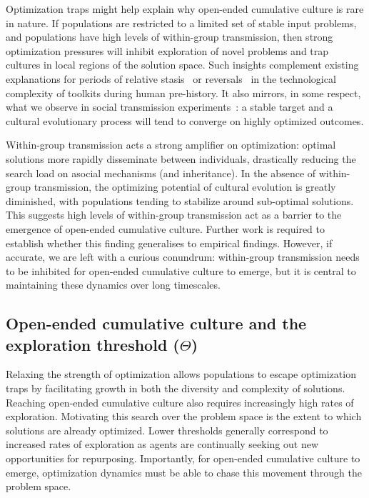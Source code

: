\documentclass{article}
\begin{document}
Optimization traps might help explain why open-ended cumulative culture is rare in nature. If populations are restricted to a limited set of stable input problems, and populations have high levels of within-group transmission, then strong optimization pressures will inhibit exploration of novel problems and trap cultures in local regions of the solution space. Such insights complement existing explanations for periods of relative stasis~\cite{powell2009late} or reversals~\cite{henrich2004demography} in the technological complexity of toolkits during human pre-history. It also mirrors, in some respect, what we observe in social transmission experiments~\cite{xxxx}: a stable target and a cultural evolutionary process will tend to converge on highly optimized outcomes.

Within-group transmission acts a strong amplifier on optimization: optimal solutions more rapidly disseminate between individuals, drastically reducing the search load on asocial mechanisms (and inheritance). In the absence of within-group transmission, the optimizing potential of cultural evolution is greatly diminished, with populations tending to stabilize around sub-optimal solutions. This suggests high levels of within-group transmission act as a barrier to the emergence of open-ended cumulative culture. Further work is required to establish whether this finding generalises to empirical findings. However, if accurate, we are left with a curious conundrum: within-group transmission needs to be inhibited for open-ended cumulative culture to emerge, but it is central to maintaining these dynamics over long timescales. 

\subsection{Open-ended cumulative culture and the exploration threshold ($\Theta$)}
Relaxing the strength of optimization allows populations to escape optimization traps by facilitating growth in both the diversity and complexity of solutions. Reaching open-ended cumulative culture also requires increasingly high rates of exploration. Motivating this search over the problem space is the extent to which solutions are already optimized. Lower thresholds generally correspond to increased rates of exploration as agents are continually seeking out new opportunities for repurposing. Importantly, for open-ended cumulative culture to emerge, optimization dynamics must be able to chase this movement through the problem space.
\end{document}
